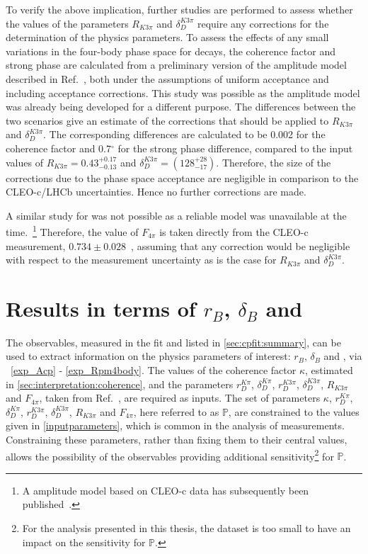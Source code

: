 To verify the above implication, further studies are performed to assess whether the values of the parameters $R_{K3\pi}$ and $\delta_D^{K3\pi}$ require any corrections for the determination of the physics parameters. To assess the effects of any small variations in the four-body phase space for \kpipipi decays, the coherence factor and strong phase are calculated from a preliminary version of the \decay{\Dz}{\Km\pip\pim\pip} amplitude model described in Ref.~\cite{LHCb-PAPER-2017-040}, both under the assumptions of uniform acceptance and including \lhcb acceptance corrections. This study was possible as the \decay{\Dz}{\Km\pip\pim\pip} amplitude model was already being developed for a different purpose. The differences between the two scenarios give an estimate of the corrections that should be applied to $R_{K3\pi}$ and $\delta_D^{K3\pi}$. The corresponding differences are calculated to be 0.002 for the coherence factor and 0.7$^{\circ}$ for the strong phase difference, compared to the input values of $R_{K3\pi} = 0.43^{+0.17}_{-0.13}$ and $\delta_D^{K3\pi} = \left(128^{+28}_{-17}\right)$. Therefore, the size of the corrections due to the \lhcb phase space acceptance are negligible in comparison to the CLEO-c/LHCb uncertainties. Hence no further corrections are made. 

A similar study for \decay{\Dz}{\pim\pip\pim\pip} was not possible as a reliable model was unavailable at the time.~\footnote{A \decay{\Dz}{\pim\pip\pim\pip} amplitude model based on CLEO-c data has subsequently been published~\cite{4piamplitude}.} Therefore, the value of $F_{4\pi}$ is taken directly from the CLEO-c measurement, $0.734 \pm 0.028$~\cite{charm4pi}, assuming that any correction would be negligible with respect to the measurement uncertainty as is the case for $R_{K3\pi}$ and $\delta_D^{K3\pi}$. 

\section{Results in terms of $r_B$, $\delta_B$ and \Pgamma}
\label{sec:interpretation:gammadini}

The \CP observables, measured in the \CP fit and listed in \sect\ref{sec:cpfit:summary}, can be used to extract information on the physics parameters of interest: $r_B$, $\delta_B$ and \Pgamma, via \eqns~\ref{exp_Acp} - \ref{exp_Rpm4body}. The values of the coherence factor $\kappa$, estimated in \sect\ref{sec:interpretation:coherence}, and the parameters $r_D^{K\pi}$, $\delta_D^{K\pi}$, $r_D^{K3\pi}$, $\delta_D^{K3\pi}$, $R_{K3\pi}$ and $F_{4\pi}$, taken from Ref.~\cite{HFAG,charmk3pi,charmk3pi_errata,LHCb-PAPER-2015-057,charm4pi}, are required as inputs. The set of parameters $\kappa$, $r_D^{K\pi}$, $\delta_D^{K\pi}$, $r_D^{K3\pi}$, $\delta_D^{K3\pi}$, $R_{K3\pi}$ and $F_{4\pi}$, here referred to as $\mathbb{P}$, are constrained to the values given in \tab\ref{inputparameters}, which is common in the analysis of \lhcb measurements. Constraining these parameters, rather than fixing them to their central values, allows the possibility of the \CP observables providing additional sensitivity\footnote{For the analysis presented in this thesis, the dataset is too small to have an impact on the sensitivity for $\mathbb{P}$.} for $\mathbb{P}$.

